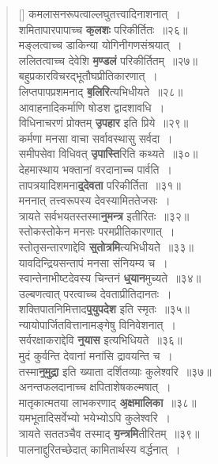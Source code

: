 \documentclass[twoside,12pt,notitlepage]{book}
\begin{document}
\begin{verse}[\versewidth]
कमलासनरूपत्वाल्लघुतत्त्वादिनाशनात्~।\\[-6pt]
शमितापारपापाच्च \textbf{\b कलशः} परिकीर्तितः~॥२६॥\\
मङ्लत्वाच्च डाकिन्या योगिनीगणसंश्रयात्~।\\[-6pt]
ललितत्वाच्च देवेशि \textbf{\b मण्डलं} परिकीर्तितम्~॥२७॥\\
बहुप्रकारविचरद्भूतौघप्रीतिकारणात्~।\\[-6pt]
लिप्तपापप्रशमनाद् \textbf{\b बलिरि}त्यभिधीयते~॥२८॥\\
आवाहनादिकर्माणि षोडश द्वादशावधि~।\\[-6pt]
विधिनाचरणं प्रोक्तम्  \textbf{\b उपहार} इति प्रिये~॥२९॥\\
कर्मणा मनसा वाचा सर्वावस्थासु सर्वदा~।\\[-6pt]
समीपसेवा विधिवत् \textbf{\b उपास्ति}रिति कथ्यते~॥३०॥\\
देहमास्थाय भक्तानां वरदानाच्च पार्वति~।\\[-6pt]
तापत्रयादिशमना\textbf{\b द्देवता} परिकीर्तिता~॥३१॥\\
मननात् तत्त्वरूपस्य देवस्यामिततेजसः~।\\[-6pt]
त्रायते सर्वभयतस्तस्मा\textbf{\b न्मन्त्र} इतीरितः~॥३२॥\\
स्तोकस्तोकेन  मनसः परमप्रीतिकारणात्~।\\[-6pt]
स्तोतृसन्तारणाद्देवि \textbf{\b स्तोत्रमि}त्यभिधीयतेे~॥३३॥\\
यावदिन्द्रियसन्तापं मनसा संनियम्य च~।\\[-6pt]
स्वान्तेनाभीष्टदेवस्य चिन्तनं \textbf{\b ध्यान}मुच्यते~॥३४॥\\
उल्बणत्वात् परत्वाच्च देवताप्रीतिदानतः~।\\[-6pt]
शक्तिपातनिमित्ताद\textbf{\b प्युपदेश} इति स्मृतः~॥३५॥\\
न्यायोपार्जितवित्तानामङ्गेषु विनिवेशनात्~।\\[-6pt]
सर्वरक्षाकराद्देवि \textbf{\b न्यास} इत्यभिधियते~॥३६॥\\
मुदं कुर्वन्ति देवानां मनांसि द्रावयन्ति च~।\\[-6pt]
तस्मा\textbf{\b न्मुद्रा} इति ख्याता दर्शितव्याः कुलेश्वरि~॥३७॥\\
अनन्तफलदानाच्च क्षपिताशेषकल्मषात्~।\\[-6pt]
मातृकात्मतया लाभकरणाद् \textbf{\b अक्षमालिका}~॥३८॥\\
यमभूतादिसर्वेभ्यो भयेभ्योऽपि कुलेश्वरि~।\\[-6pt]
त्रायते सततञ्चैव तस्माद् \textbf{\b यन्त्रमि}तीरितम्~॥३९॥\\
पालनाद्दुरितच्छेदात् कामितार्थस्य वर्द्धनात्~।\\[-6pt]

\end{verse}
\end{document}
